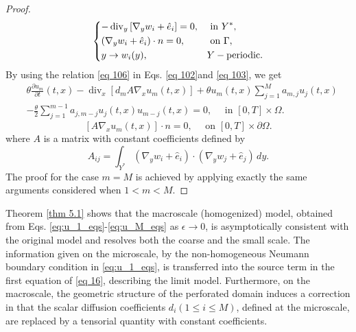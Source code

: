 \begin{proof}
\begin{equation}
 \begin{dcases}
-\operatorname{div}_{y}\left[\nabla_{y} w_{i}+\hat{e}_{i}\right]=0, & \text { in } Y^{*}, \\
\left(\nabla_{y} w_{i}+\hat{e}_{i}\right) \cdot n=0, & \text { on } \Gamma, \\
y \rightarrow w_{i}(y), & Y-\text {periodic}. 
\end{dcases}
\label{eq 107}\end{equation}
By using the relation \eqref{eq 106} in Eqs. \eqref{eq 102}and \eqref{eq 103}, we get
\begin{equation}
 \begin{aligned}
&\theta \frac{\partial u_{m}}{\partial t}(t, x)-\operatorname{div}_{x}\left[d_{m} A \nabla_{x} u_{m}(t, x)\right]+\theta u_{m}(t, x) \sum_{j=1}^{M} a_{m, j} u_{j}(t, x) \\
&-\frac{\theta}{2} \sum_{j=1}^{m-1} a_{j, m-j} u_{j}(t, x) u_{m-j}(t, x)=0, \quad \text { in }[0, T] \times \Omega. \end{aligned}
\label{eq 108}\end{equation}
\begin{equation}
 \left[A \nabla_{x} u_{m}(t, x)\right] \cdot n=0, \quad \text { on }[0, T] \times \partial \Omega.
\label{eq 109}\end{equation}
where $A$ is a matrix with constant coefficients defined by
$$
A_{i j}=\int_{Y^{*}}\left(\nabla_{y} w_{i}+\hat{e}_{i}\right) \cdot\left(\nabla_{y} w_{j}+\hat{e}_{j}\right) \, d  y .
$$
The proof for the case $m=M$ is achieved by applying exactly the same arguments considered when $1<m<M$.
\end{proof}
Theorem \eqref{thm 5.1} shows that the macroscale (homogenized) model, obtained from Eqs. \eqref{eq:u_1_eqs}-\eqref{eq:u_M_eqs} as $\epsilon \rightarrow 0$, is asymptotically consistent with the original model and resolves both the coarse and the small scale. The information given on the microscale, by the non-homogeneous Neumann boundary condition in \eqref{eq:u_1_eqs}, is transferred into the source term in the first equation of \eqref{eq 16}, describing the limit model. Furthermore, on the macroscale, the geometric structure of the perforated domain induces a correction in that the scalar diffusion coefficients $d_{i}(1 \leq i \leq M)$, defined at the microscale, are replaced by a tensorial quantity with constant coefficients.
